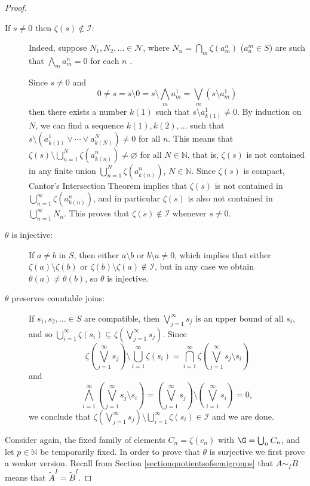 \begin{proof}
\begin{description}
\item[If $s\neq 0$ then $\zeta(s)\not\in\mathcal{I}$:] Indeed, suppose $N_1,N_2,\ldots\in\mathcal{N}$, where $N_n=\bigcap_m\zeta(a^n_m)$ ($a^m_n\in S$) are such that $\bigwedge_m a^n_m=0$ for each $n$ .

Since $s\neq 0$ and
\[0\neq s=s\setminus 0=s\setminus\bigwedge_m a^1_m=\bigvee_m(s\setminus a^1_m)\]
then there exists a number $k(1)$ such that $s\setminus a^1_{k(1)}\neq 0$. By induction on $N$, we can find a sequence $k(1),k(2),\ldots$ such that $s\setminus(a^1_{k(1)}\lor\cdots\lor a^N_{k(N)})\neq 0$ for all $n$. This means that $\zeta(s)\setminus\bigcup_{n=1}^N\zeta(a^n_{k(n)})\neq\varnothing$ for all $N\in\mathbb{N}$, that is, $\zeta(s)$ is not contained in any finite union $\bigcup_{n=1}^N\zeta(a^n_{k(n)})$, $N\in\mathbb{N}$. Since $\zeta(s)$ is compact, Cantor's Intersection Theorem implies that $\zeta(s)$ is not contained in $\bigcup_{n=1}^\infty\zeta(a^n_{k(n)})$, and in particular $\zeta(s)$ is also not contained in $\bigcup_{n=1}^\infty N_n$. This proves that $\zeta(s)\not\in\mathcal{I}$ whenever $s\neq 0$.

\item[$\theta$ is injective:] If $a\neq b$ in $S$, then either $a\setminus b$ or $b\setminus a\neq 0$, which implies that either $\zeta(a)\setminus\zeta(b)$ or $\zeta(b)\setminus\zeta(a)\not\in\mathcal{I}$, but in any case we obtain $\theta(a)\neq\theta(b)$, so $\theta$ is injective.

\item[$\theta$ preserves countable joins:] If $s_1,s_2,\ldots\in S$ are compatible, then $\bigvee_{j=1}^\infty s_j$ is an upper bound of all $s_i$, and so $\bigcup_{i=1}^\infty\zeta(s_i)\subseteq\zeta\left(\bigvee_{j=1}^\infty s_j\right)$. Since
\[\zeta\left(\bigvee_{j=1}^\infty s_j\right)\setminus\bigcup_{i=1}^\infty\zeta(s_i)=\bigcap_{i=1}^\infty\zeta\left(\bigvee_{j=1}^\infty s_j\setminus s_i\right)\]
and
\[\bigwedge_{i=1}^\infty\left(\bigvee_{j=1}^\infty s_j\setminus s_i\right)=\left(\bigvee_{j=1}^\infty s_j\right)\setminus\left(\bigvee_{i=1}^\infty s_i\right)=0,\]
we conclude that $\zeta\left(\bigvee_{j=1}^\infty s_j\right)\setminus\bigcup_{i=1}^\infty\zeta(s_i)\in\mathcal{I}$ and we are done.
\end{description}

Consider again, the fixed family of elements $C_n=\zeta(c_n)$ with $\G=\bigcup_n C_n$, and let $p\in\mathbb{N}$ be temporarily fixed. In order to prove that $\theta$ is surjective we first prove a weaker version. Recall from Section \ref{sectionquotientsofsemigroups} that $A\sim_I B$ means that $\widetilde{A}^I=\widetilde{B}^I$.


\end{proof}
